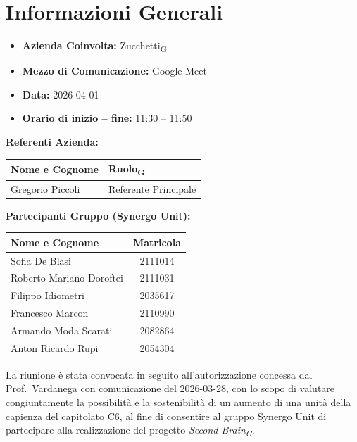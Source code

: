 \section{Informazioni Generali}
\begin{itemize}
	\item \textbf{Azienda Coinvolta:} {Zucchetti\textsubscript{G}}
	\item \textbf{Mezzo di Comunicazione:} {Google Meet}
	\item \textbf{Data:} 2026-04-01
	\item \textbf{Orario di inizio -- fine:} 11:30 -- 11:50
\end{itemize}


\vspace{0.5cm}
\textbf{Referenti Azienda:}
\begin{table}[ht]
	\centering
	\renewcommand{\arraystretch}{1.2}
	\begin{tabularx}{\textwidth}{X l}
		\toprule
		\textbf{Nome e Cognome} & \textbf{Ruolo\textsubscript{G}} \\
		\midrule
		{Gregorio Piccoli} & {Referente Principale} \\
		\bottomrule
	\end{tabularx}
\end{table}

\vspace{0.5cm}
\textbf{Partecipanti Gruppo (Synergo Unit):}
\begin{table}[ht]
	\centering
	\renewcommand{\arraystretch}{1.2}
	\begin{tabularx}{\textwidth}{X c}
		\toprule
		\textbf{Nome e Cognome} & \textbf{Matricola}\\
		\midrule
		Sofia De Blasi & 2111014 \\
		Roberto Mariano Doroftei & 2111031 \\
		Filippo Idiometri & 2035617 \\
		Francesco Marcon & 2110990 \\
		Armando Moda Scarati & 2082864 \\
		Anton Ricardo Rupi & 2054304 \\
		\bottomrule
	\end{tabularx}
\end{table}

\vspace{0.5cm}
 
La riunione è stata convocata in seguito all'autorizzazione concessa dal
Prof.\ Vardanega con comunicazione del 2026-03-28, con lo scopo di valutare
congiuntamente la possibilità e la sostenibilità di un aumento di una unità
della capienza del capitolato C6, al fine di consentire al gruppo Synergo Unit
di partecipare alla realizzazione del progetto \textit{Second Brain\textsubscript{G}}.
 
